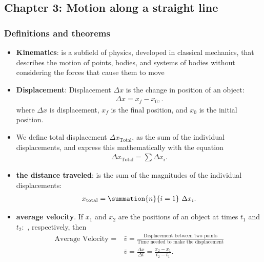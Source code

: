 \documentclass{report}
\begin{document}
    \pagebreak 
    \subsection{Chapter 3: Motion along a straight line}
    \bigbreak \noindent 
    \subsubsection{Definitions and theorems}
    \begin{itemize}
        \item \textbf{Kinematics}: is a subfield of physics, developed in classical mechanics, that describes the motion of points, bodies, and systems of bodies without considering the forces that cause them to move
        \item \textbf{Displacement}: Displacement $\Delta x$ is the change in position of an object:
            \begin{align*}
                \Delta x = x_f - x_0,
            .\end{align*}
            where $\Delta x$ is displacement, $x_f$ is the final position, and $x_0$ is the initial position.
        \item We define total displacement $\Delta x_{\text{Total}}$, as the sum of the individual displacements, and express this mathematically with the equation
            \begin{align*}
                \Delta x_{\text{Total}} = \sum \Delta x_i
            .\end{align*}
        \item \textbf{the distance traveled}: is the sum of the magnitudes of the individual displacements:
            \begin{align*}
                x_{\text{total}} = \summation{n}{i=1}\ \Delta x_{i}
            .\end{align*}
        \item \textbf{average velocity}. If  $x_{1}$ and  $x_{2} $ are the positions of an object at times  $t_{1} $ and  $t_{2}:$ , respectively, then 
            \begin{align*}
                \text{Average Velocity } =\ &\bar{v} =  \frac{\text{Displacement between two points}}{\text{Time needed to make the displacement}} \\
                &\bar{v} = \frac{\Delta x}{\Delta t} = \frac{x_{2} - x_{1}}{t_{2} - t_{1}}
            .\end{align*}
        

\end{itemize}
\end{document}
